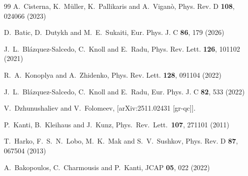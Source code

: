 \documentclass[11pt,a4paper]{article}
\begin{document}
\begin{thebibliography}{99}
A.~Cisterna, K.~M{\"u}ller, K.~Pallikaris and A.~Vigan{\`o},
Phys. Rev. D \textbf{108}, 024066 (2023)

D.~Batic, D.~Dutykh and M.~E.~Sukaiti,
Eur. Phys. J. C \textbf{86}, 179 (2026)




J.~L.~Bl\'azquez-Salcedo, C.~Knoll and E.~Radu,
Phys. Rev. Lett. \textbf{126}, 101102 (2021)

R.~A.~Konoplya and A.~Zhidenko,
Phys. Rev. Lett. \textbf{128}, 091104 (2022)

J.~L.~Bl{\'a}zquez-Salcedo, C.~Knoll and E.~Radu,
Eur. Phys. J. C \textbf{82}, 533 (2022)

V.~Dzhunushaliev and V.~Folomeev,
[arXiv:2511.02431 [gr-qc]].



  P.~Kanti, B.~Kleihaus and J.~Kunz,
  Phys.\ Rev.\ Lett.\  {\bf 107}, 271101 (2011)


T.~Harko, F.~S.~N.~Lobo, M.~K.~Mak and S.~V.~Sushkov,
Phys. Rev. D \textbf{87}, 067504 (2013)

A.~Bakopoulos, C.~Charmousis and P.~Kanti,
JCAP \textbf{05}, 022 (2022)


\end{thebibliography}
\end{document}
